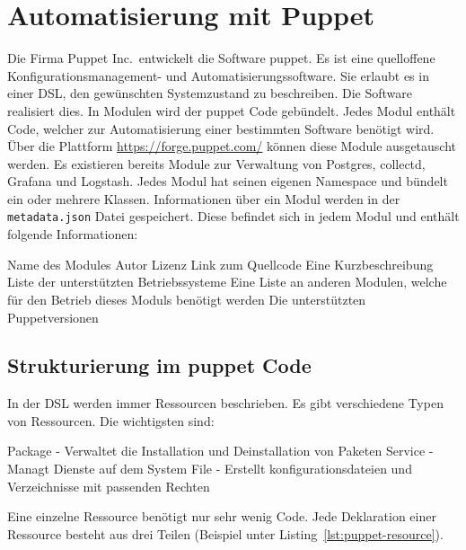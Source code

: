 \section{Automatisierung mit Puppet}
Die Firma Puppet Inc.\ entwickelt die Software puppet. Es ist eine quelloffene
Konfigurationsmanagement\hyp{} und Automatisierungssoftware. Sie erlaubt es in
einer  \gls{DSL}, den
gewünschten Systemzustand zu beschreiben. Die Software realisiert dies. In
Modulen wird der puppet Code gebündelt. Jedes Modul enthält Code, welcher zur
Automatisierung einer bestimmten Software benötigt wird. Über die Plattform
\url{https://forge.puppet.com/} können diese Module ausgetauscht werden. Es
existieren bereits Module zur Verwaltung von Postgres, collectd, Grafana und
Logstash. Jedes Modul hat seinen eigenen \gls{Namespace} und bündelt ein oder
mehrere Klassen. Informationen über ein Modul werden in der
\texttt{metadata.json} Datei gespeichert. Diese befindet sich in jedem Modul
und enthält folgende Informationen:

\begin{outline}
  \1 Name des Modules
  \1 Autor
  \1 Lizenz
  \1 Link zum Quellcode
  \1 Eine Kurzbeschreibung
  \1 Liste der unterstützten Betriebssysteme
  \1 Eine Liste an anderen Modulen, welche für den Betrieb dieses Moduls
  benötigt werden
  \1 Die unterstützten Puppetversionen
\end{outline}
\tm%

\subsection{Strukturierung im puppet Code}
In der \gls{DSL} werden immer Ressourcen beschrieben. Es gibt verschiedene
Typen von Ressourcen. Die wichtigsten sind:

\begin{outline}
  \1 Package \hyp{} Verwaltet die Installation und Deinstallation von Paketen
  \1 Service \hyp{} Managt Dienste auf dem System
  \1 File \hyp{} Erstellt konfigurationsdateien und Verzeichnisse mit passenden
  Rechten
\end{outline}

Eine einzelne Ressource benötigt nur sehr wenig Code. Jede Deklaration einer
Ressource besteht aus drei Teilen (Beispiel unter
Listing~\ref{lst:puppet-resource}).

